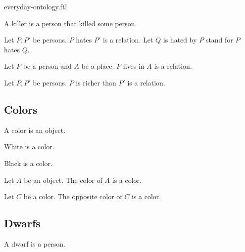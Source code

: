 \documentclass{naproche-library}
\begin{document}
\begin{smodule}{everyday-ontology.ftl}
\begin{definition*}[forthel]
  A killer is a person that killed some person.
\end{definition*}

\begin{signature*}[forthel]
  Let $P, P'$ be persons.
  $P$ hates $P'$ is a relation.
  Let $Q$ is hated by $P$ stand for $P$ hates $Q$.
\end{signature*}

\begin{signature*}[forthel]
  Let $P$ be a person and $A$ be a place.
  $P$ lives in $A$ is a relation.
\end{signature*}

\begin{signature*}[forthel]
  Let $P, P'$ be persons.
  $P$ is richer than $P'$ is a relation.
\end{signature*}


\subsection{Colors}

\begin{signature*}[forthel]
  A color is an object.
\end{signature*}

\begin{signature*}[forthel]
  White is a color.
\end{signature*}

\begin{signature*}[forthel]
  Black is a color.
\end{signature*}

\begin{signature*}[forthel]
  Let $A$ be an object.
  The color of $A$ is a color.
\end{signature*}

\begin{signature*}[forthel]
  Let $C$ be a color.
  The opposite color of $C$ is a color.
\end{signature*}


\subsection{Dwarfs}

\begin{signature*}[forthel]
  A dwarf is a person.
\end{signature*}



\end{smodule}
\end{document}
